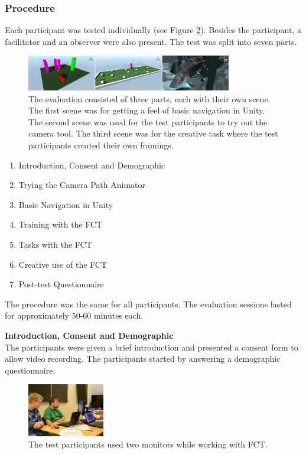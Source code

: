 \subsubsection{Procedure}
Each participant was tested individually (see Figure \ref{fig:tt}). Besides the participant, a facilitator and an observer were also present. The test was split into seven parts.
\begin{figure}[hbtp]
\centering
\includegraphics[width=0.8\textwidth]{Pics/sceneAll_horizontal}
\caption{The evaluation consisted of three parts, each with their own scene. The first scene was for getting a feel of basic navigation in Unity. The second scene was used for the test participants to try out the camera tool. The third scene was for the creative task where the test participants created their own framings.}
\label{fig:sceneAll}
\end{figure}

\begin{enumerate}
\item Introduction, Consent and Demographic
\item Trying the Camera Path Animator
\item Basic Navigation in Unity
\item Training with the FCT
\item Tasks with the FCT
\item Creative use of the FCT
\item Post-test Questionnaire
\end{enumerate}

The procedure was the same for all participants. The evaluation sessions lasted for approximately 50-60 minutes each.


\textbf{Introduction, Consent and Demographic}\\
The participants were given a brief introduction and presented a consent form to allow video recording. The participants started by answering a demographic questionnaire. 

\begin{figure}[htbp]
\centering
\includegraphics[width=0.3\textwidth]{Pics/test_setup}
\caption{The test participants used two monitors while working with FCT.}
\label{fig:tt}
\end{figure}

